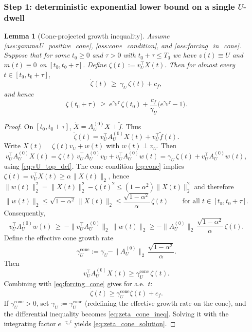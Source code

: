 \documentclass[12pt,a4paper]{article}
\newtheorem{lemma}{Lemma}
\theoremstyle{definition}
\theoremstyle{remark}
\begin{document}
\subsubsection*{Step 1: deterministic exponential lower bound on a single $U$-dwell}

\begin{lemma}[Cone-projected growth inequality]\label{lem:cone_projected_growth}
	Assume \ref{ass:gammaU_positive_cone}, \ref{ass:cone_condition}, and \ref{ass:forcing_in_cone}.
	Suppose that for some $t_0\ge 0$ and $\tau>0$ with $t_0+\tau\le T_0$ we have $z(t)\equiv U$ and $m(t)\equiv 0$ on $[t_0,t_0+\tau]$.
	Define $\zeta(t):=v_U^\top X(t)$. Then for almost every $t\in[t_0,t_0+\tau]$,
	\begin{equation}\label{eq:zeta_cone_ineq}
		\dot\zeta(t)\ \ge\ \gamma_U\,\zeta(t)+c_f,
	\end{equation}
	and hence
	\begin{equation}\label{eq:zeta_cone_solution}
		\zeta(t_0+\tau)\ \ge\ e^{\gamma_U\tau}\,\zeta(t_0)+\frac{c_f}{\gamma_U}\Big(e^{\gamma_U\tau}-1\Big).
	\end{equation}
\end{lemma}

\begin{proof}
	On $[t_0,t_0+\tau]$, $\dot X=A_U^{(0)}X+\widetilde f$. Thus
	\[
	\dot\zeta(t)=v_U^\top A_U^{(0)}X(t)+v_U^\top\widetilde f(t).
	\]
	Write $X(t)=\zeta(t)v_U+w(t)$ with $w(t)\perp v_U$. Then
	\[
	v_U^\top A_U^{(0)}X(t)
	=\zeta(t)\,v_U^\top A_U^{(0)}v_U + v_U^\top A_U^{(0)}w(t)
	=\gamma_U\,\zeta(t) + v_U^\top A_U^{(0)}w(t),
	\]
	using \eqref{eq:vU_top_def}. The cone condition \eqref{eq:cone} implies
	$\zeta(t)=v_U^\top X(t)\ge \alpha\|X(t)\|_2$, hence $\|w(t)\|_2^2=\|X(t)\|_2^2-\zeta(t)^2\le (1-\alpha^2)\|X(t)\|_2^2$ and therefore
	\begin{equation}\label{eq:w_bound}
		\|w(t)\|_2 \le \sqrt{1-\alpha^2}\,\|X(t)\|_2 \le \frac{\sqrt{1-\alpha^2}}{\alpha}\,\zeta(t)
		\qquad \text{for all } t\in[t_0,t_0+\tau].
	\end{equation}
	Consequently,
	\[
	v_U^\top A_U^{(0)}w(t)\ \ge\ -\|v_U^\top A_U^{(0)}\|_2\,\|w(t)\|_2
	\ge
	-\|A_U^{(0)}\|_2\,\frac{\sqrt{1-\alpha^2}}{\alpha}\,\zeta(t).
	\]
	Define the effective cone growth rate
	\begin{equation}\label{eq:gammaU_eff}
		\gamma_U^{\mathrm{cone}}
		:=
		\gamma_U - \|A_U^{(0)}\|_2\,\frac{\sqrt{1-\alpha^2}}{\alpha}.
	\end{equation}
	Then
	\[
	v_U^\top A_U^{(0)}X(t)
	\ge
	\gamma_U^{\mathrm{cone}}\,\zeta(t).
	\]
	Combining with \eqref{eq:forcing_cone} gives for a.e.\ $t$:
	\[
	\dot\zeta(t)\ge \gamma_U^{\mathrm{cone}}\zeta(t)+c_f.
	\]
	If $\gamma_U^{\mathrm{cone}}>0$, set $\gamma_U:=\gamma_U^{\mathrm{cone}}$ (redefining the effective growth rate on the cone),
	and the differential inequality becomes \eqref{eq:zeta_cone_ineq}. Solving it with the integrating factor
	$e^{-\gamma_U t}$ yields \eqref{eq:zeta_cone_solution}.
\end{proof}
\end{document}

